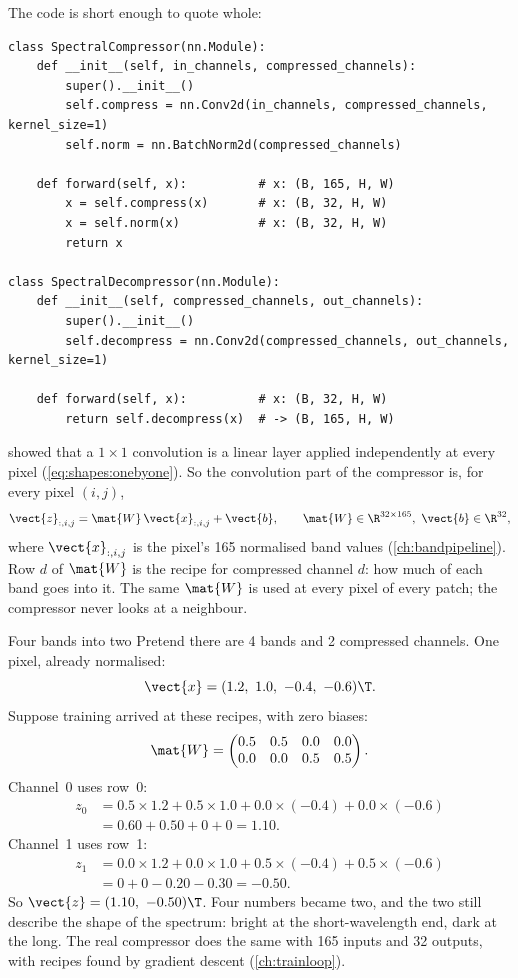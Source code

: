 The code is short enough to quote whole:
\begin{lstlisting}
class SpectralCompressor(nn.Module):
    def __init__(self, in_channels, compressed_channels):
        super().__init__()
        self.compress = nn.Conv2d(in_channels, compressed_channels, kernel_size=1)
        self.norm = nn.BatchNorm2d(compressed_channels)

    def forward(self, x):          # x: (B, 165, H, W)
        x = self.compress(x)       # x: (B, 32, H, W)
        x = self.norm(x)           # x: (B, 32, H, W)
        return x

class SpectralDecompressor(nn.Module):
    def __init__(self, compressed_channels, out_channels):
        super().__init__()
        self.decompress = nn.Conv2d(compressed_channels, out_channels, kernel_size=1)

    def forward(self, x):          # x: (B, 32, H, W)
        return self.decompress(x)  # -> (B, 165, H, W)
\end{lstlisting}

 showed that a $1\times1$ convolution is a linear layer applied independently at every
pixel (\cref{eq:shapes:onebyone}). So the convolution part of the compressor is, for every pixel
$(i,j)$,
\begin{equation}\label{eq:compressor:conv}
\vect{z}_{:,i,j} = \mat{W}\,\vect{x}_{:,i,j} + \vect{b},\qquad
\mat{W}\in\R^{32\times165},\ \vect{b}\in\R^{32},
\end{equation}
where $\vect{x}_{:,i,j}$ is the pixel's 165 normalised band values (\cref{ch:bandpipeline}). Row $d$ of
$\mat{W}$ is the recipe for compressed channel $d$: how much of each band goes into it. The same
$\mat{W}$ is used at every pixel of every patch; the compressor never looks at a neighbour.

\begin{worked}[label={we:compressor:mix}]{Four bands into two}
Pretend there are 4 bands and 2 compressed channels. One pixel, already normalised:
\[
\vect{x} = (1.2,\ 1.0,\ -0.4,\ -0.6)\T .
\]
Suppose training arrived at these recipes, with zero biases:
\[
\mat{W} = \begin{pmatrix}0.5 & 0.5 & 0.0 & 0.0\\ 0.0 & 0.0 & 0.5 & 0.5\end{pmatrix}.
\]
Channel~0 uses row~0:
\begin{align*}
z_0 &= 0.5\times1.2 + 0.5\times1.0 + 0.0\times(-0.4) + 0.0\times(-0.6)\\
&= 0.60 + 0.50 + 0 + 0 = 1.10.
\end{align*}
Channel~1 uses row~1:
\begin{align*}
z_1 &= 0.0\times1.2 + 0.0\times1.0 + 0.5\times(-0.4) + 0.5\times(-0.6)\\
&= 0 + 0 - 0.20 - 0.30 = -0.50.
\end{align*}
So $\vect{z} = (1.10,\ -0.50)\T$. Four numbers became two, and the two still describe the shape of the
spectrum: bright at the short-wavelength end, dark at the long. The real compressor does the same with
165 inputs and 32 outputs, with recipes found by gradient descent (\cref{ch:trainloop}).
\end{worked}

